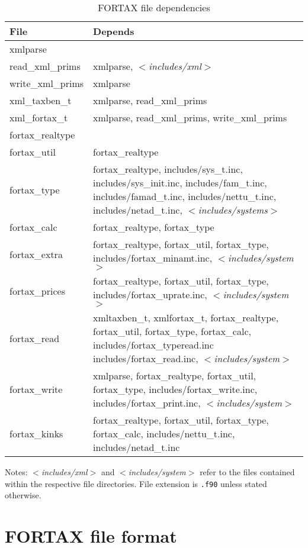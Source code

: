 \documentclass[11pt,thmsa,letter,ukenglish]{article}
\begin{document}
\begin{table}
\footnotesize
\caption{FORTAX file dependencies}\label{table:depends}
 \begin{tabularx}{\textwidth}{lX}
  \toprule
File & Depends\\
\midrule
xmlparse\\
read\_xml\_prims & xmlparse, \emph{$<$includes/xml$>$}\\
write\_xml\_prims & xmlparse\\
xml\_taxben\_t & xmlparse, read\_xml\_prims\\
xml\_fortax\_t & xmlparse, read\_xml\_prims, write\_xml\_prims\\
fortax\_realtype\\
fortax\_util & fortax\_realtype\\
fortax\_type & fortax\_realtype, includes/sys\_t.inc, includes/sys\_init.inc, includes/fam\_t.inc, includes/famad\_t.inc, includes/nettu\_t.inc, includes/netad\_t.inc, \emph{$<$includes/systems$>$}\\
fortax\_calc & fortax\_realtype, fortax\_type\\
fortax\_extra & fortax\_realtype, fortax\_util, fortax\_type, includes/fortax\_minamt.inc, \emph{$<$includes/system$>$}\\
fortax\_prices & fortax\_realtype, fortax\_util, fortax\_type, includes/fortax\_uprate.inc, \emph{$<$includes/system$>$}\\
 fortax\_read & xmltaxben\_t, xmlfortax\_t, fortax\_realtype, fortax\_util, fortax\_type, fortax\_calc, includes/fortax\_typeread.inc includes/fortax\_read.inc, \emph{$<$includes/system$>$}\\
 fortax\_write & xmlparse, fortax\_realtype, fortax\_util, fortax\_type, includes/fortax\_write.inc, includes/fortax\_print.inc, \emph{$<$includes/system$>$}\\
 fortax\_kinks & fortax\_realtype, fortax\_util, fortax\_type, fortax\_calc, includes/nettu\_t.inc, includes/netad\_t.inc\\
\bottomrule
\end{tabularx}

\footnotesize{Notes: \emph{$<$includes/xml$>$} and \emph{$<$includes/system$>$} refer to the files contained within the respective file directories. File extension is \texttt{.f90} unless stated otherwise.}
\end{table}

\section{FORTAX file format}\label{sec:fortaxformat}
\end{document}
